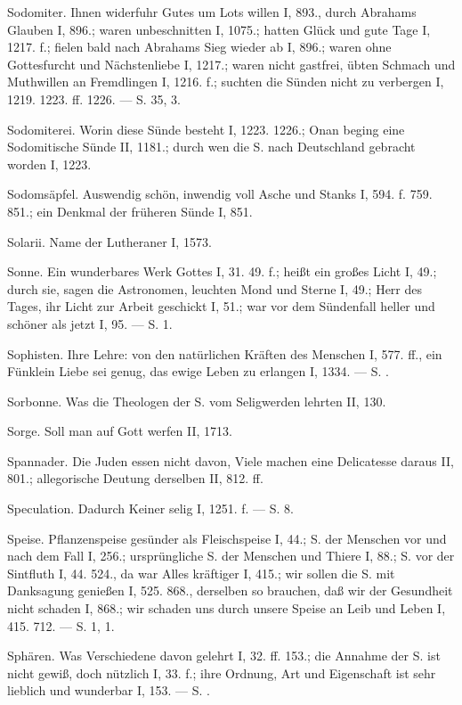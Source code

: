 Sodomiter. Ihnen widerfuhr Gutes um Lots willen I, 893., durch Abrahams Glauben I, 896.; waren unbeschnitten I, 1075.; hatten Glück und gute Tage I, 1217. f.; fielen bald nach Abrahams Sieg wieder ab I, 896.; waren ohne Gottesfurcht und Nächstenliebe I, 1217.; waren nicht gastfrei, übten Schmach und Muthwillen an Fremdlingen I, 1216. f.; suchten die Sünden nicht zu verbergen I, 1219. 1223. ff. 1226. — S.  35,  3.

Sodomiterei. Worin diese Sünde besteht I, 1223. 1226.; Onan beging eine Sodomitische Sünde II, 1181.; durch wen die S. nach Deutschland gebracht worden I, 1223.

Sodomsäpfel. Auswendig schön, inwendig voll Asche und Stanks I, 594. f. 759. 851.; ein Denkmal der früheren Sünde I, 851.

Solarii. Name der Lutheraner I, 1573.

Sonne. Ein wunderbares Werk Gottes I, 31. 49. f.; heißt ein großes Licht I, 49.; durch sie, sagen die Astronomen, leuchten Mond und Sterne I, 49.; Herr des Tages, ihr Licht zur Arbeit geschickt I, 51.; war vor dem Sündenfall heller und schöner als jetzt I, 95. — S.  1.

Sophisten. Ihre Lehre: von den natürlichen Kräften des Menschen I, 577. ff., ein Fünklein Liebe sei genug, das ewige Leben zu erlangen I, 1334. — S. .

Sorbonne. Was die Theologen der S. vom Seligwerden lehrten II, 130.

Sorge. Soll man auf Gott werfen II, 1713.

Spannader. Die Juden essen nicht davon, Viele machen eine Delicatesse daraus II, 801.; allegorische Deutung derselben II, 812. ff.

Speculation. Dadurch Keiner selig I, 1251. f. — S.  8.

Speise. Pflanzenspeise gesünder als Fleischspeise I, 44.; S. der Menschen vor und nach dem Fall I, 256.; ursprüngliche S. der Menschen und Thiere I, 88.; S. vor der Sintfluth I, 44. 524., da war Alles kräftiger I, 415.; wir sollen die S. mit Danksagung genießen I, 525. 868., derselben so brauchen, daß wir der Gesundheit nicht schaden I, 868.; wir schaden uns durch unsere Speise an Leib und Leben I, 415. 712. — S.  1,  1.

Sphären. Was Verschiedene davon gelehrt I, 32. ff. 153.; die Annahme der S. ist nicht gewiß, doch nützlich I, 33. f.; ihre Ordnung, Art und Eigenschaft ist sehr lieblich und wunderbar I, 153. — S. .

